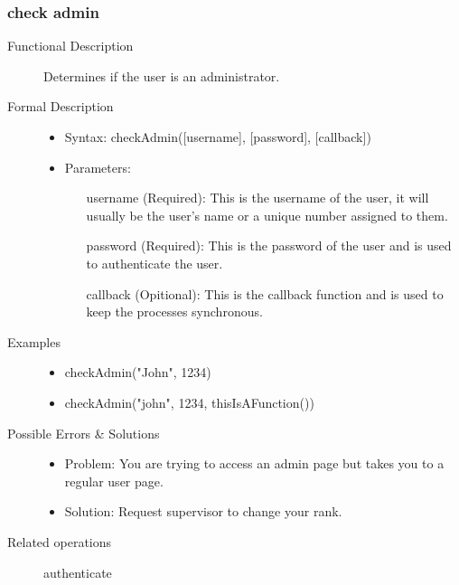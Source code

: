 \documentclass[14pt, a4paper]{article}
\begin{document}
\subsubsection{check admin}
\begin{description}
\item[Functional Description] Determines if the user is an administrator.
\item[Formal Description]\hfill
\begin{itemize}
	\item Syntax: checkAdmin([username], [password], [callback])\\
	\item Parameters:
		\begin{itemize}
			\item [username] (Required): This is the username of the user, it will usually be the user's name or a unique number assigned to them.
			\item [password] (Required): This is the password of the user and is used to authenticate the user.
			\item [callback](Opitional): This is the callback function and is used to keep the processes synchronous.
		\end{itemize}
\end{itemize}
\item[Examples]\hfill
\begin{itemize}
	\item checkAdmin("John", 1234)
	\item checkAdmin("john", 1234, thisIsAFunction(){})
\end{itemize}
\item[Possible Errors \& Solutions]
\begin{itemize}
	\item Problem: You are trying to access an admin page but takes you to a regular user page.
	\item Solution: Request supervisor to change your rank.
\end{itemize}
\item[Related operations] authenticate
\end{description}
\end{document}
